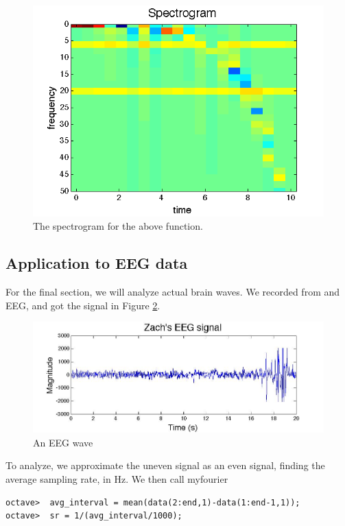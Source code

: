 \documentclass{article}
\begin{document}
\begin{figure}[htbp]
\begin{center}
\includegraphics[scale=0.6]{sg2.png}
\caption{The spectrogram for the above function.}
\label{fig:sg}
\end{center}
\end{figure}



\subsection{Application to EEG data}
For the final section, we will analyze actual brain waves.  We recorded from and EEG, and got the signal in Figure \ref{fig:EEGwv}.

\begin{figure}[htbp]
\begin{center}
\includegraphics[scale=0.5]{EEGwv}
\caption{An EEG wave}
\label{fig:EEGwv}
\end{center}
\end{figure}

To analyze, we approximate the uneven signal as an even signal, finding the average sampling rate, in Hz.  We then call myfourier
\begin{verbatim}
octave>  avg_interval = mean(data(2:end,1)-data(1:end-1,1));
octave>  sr = 1/(avg_interval/1000);

\end{verbatim}
\end{document}
